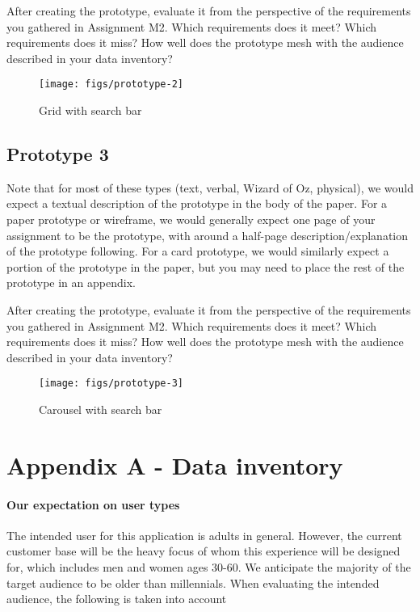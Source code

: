 After creating the prototype, evaluate it from the perspective of the requirements you gathered in Assignment M2. Which requirements does it meet? Which requirements does it miss? How well does the prototype mesh with the audience described in your data inventory?

\begin{figure}[H]
  \centering
  \texttt{[image: figs/prototype-2]}
  \caption{Grid with search bar}
  \label{fig::1}
\end{figure}


\subsection{Prototype 3}
Note that for most of these types (text, verbal, Wizard of Oz, physical), we would expect a textual description of the prototype in the body of the paper. For a paper prototype or wireframe, we would generally expect one page of your assignment to be the prototype, with around a half-page description/explanation of the prototype following. For a card prototype, we would similarly expect a portion of the prototype in the paper, but you may need to place the rest of the prototype in an appendix.

After creating the prototype, evaluate it from the perspective of the requirements you gathered in Assignment M2. Which requirements does it meet? Which requirements does it miss? How well does the prototype mesh with the audience described in your data inventory?

\begin{figure}[H]
  \centering
  \texttt{[image: figs/prototype-3]}
  \caption{Carousel with search bar}
  \label{fig::1}
\end{figure}





\clearpage

\section{Appendix A - Data inventory}

\paragraph{Our expectation on user types}
The intended user for this application is adults in general. However, the current customer base will be the heavy focus of whom this experience will be designed for, which includes men and women ages 30-60. We anticipate the majority of the target audience to be older than millennials. When evaluating the intended audience, the following is taken into account

